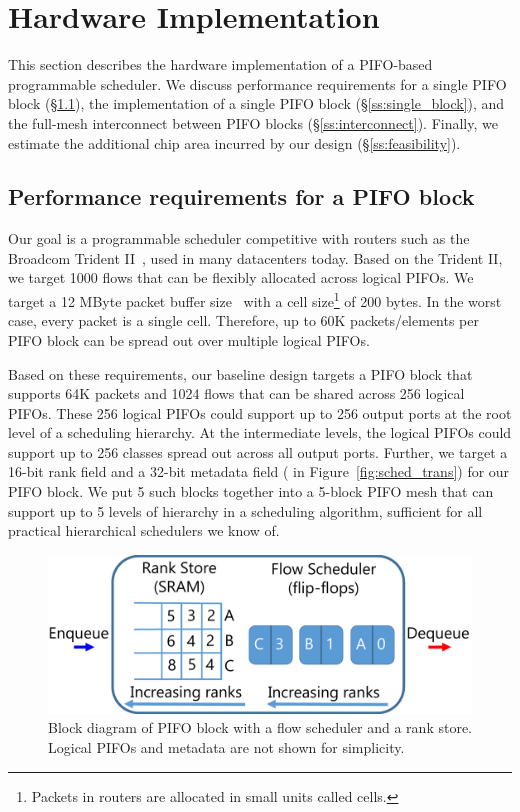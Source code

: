 \section{Hardware Implementation}
\label{s:hardware}
This section describes the hardware implementation of a PIFO-based programmable
scheduler. We discuss performance requirements for a single PIFO block
(\S\ref{ss:performance}), the implementation of a single PIFO block
(\S\ref{ss:single_block}), and the full-mesh interconnect between PIFO blocks
(\S\ref{ss:interconnect}).  Finally, we estimate the additional chip area
incurred by our design (\S\ref{ss:feasibility}).

\subsection{Performance requirements for a PIFO block}
\label{ss:performance}

Our goal is a programmable scheduler competitive with routers such as the
Broadcom Trident II~\cite{trident2}, used in many datacenters today.  Based on
the Trident II, we target 1000 flows that can be flexibly allocated across
logical PIFOs. We target a 12 MByte packet buffer size~\cite{bcom_buffer} with
a cell size\footnote{Packets in routers are allocated in small units called
cells.} of 200 bytes.  In the worst case, every packet is a single cell.
Therefore, up to 60K packets/elements per PIFO block can be spread out over
multiple logical PIFOs.

 Based on these requirements, our baseline design targets a PIFO block that
supports 64K packets and 1024 flows that can be shared across 256 logical
PIFOs. These 256 logical PIFOs could support up to 256 output ports at the root
level of a scheduling hierarchy. At the intermediate levels, the logical PIFOs
could support up to 256 classes spread out across all output ports. Further, we
target a 16-bit rank field and a 32-bit metadata field ( in
Figure~\ref{fig:sched_trans}) for our PIFO block.  We put 5 such blocks
together into a 5-block PIFO mesh that can support up to 5 levels of hierarchy
in a scheduling algorithm, sufficient for all practical hierarchical schedulers
we know of.

\begin{figure}[!t]
  \centering
  \includegraphics[width=0.6\columnwidth]{pifo_pifo_impl.pdf}
  \caption{Block diagram of PIFO block with a flow scheduler and a
   rank store. Logical PIFOs and metadata are not shown for simplicity.}
  \label{fig:pifo_impl}
\end{figure}

